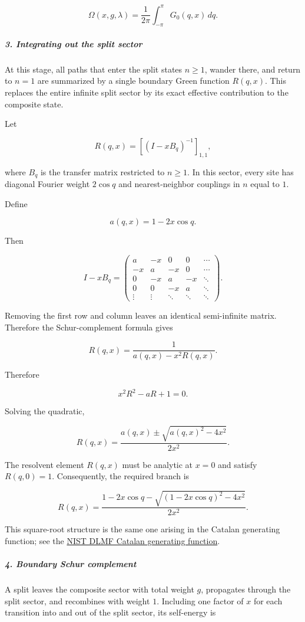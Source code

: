 \[
\Omega(x,g,\lambda) = \frac{1}{2\pi}\int_{-\pi}^{\pi}G_0(q,x)\,dq.
\]

\subparagraph*{3. Integrating out the split sector}

At this stage, all paths that enter the split states $n\geq1$, wander there, and return to $n=1$ are summarized by a single boundary Green function $R(q,x)$. This replaces the entire infinite split sector by its exact effective contribution to the composite state.

Let

\[
R(q,x) = \left[(I-xB_q)^{-1}\right]_{1,1},
\]

where $B_q$ is the transfer matrix restricted to $n\geq1$. In this sector, every site has diagonal Fourier weight $2\cos q$ and nearest-neighbor couplings in $n$ equal to $1$.

Define

\[
a(q,x)=1-2x\cos q.
\]

Then

\[
I-xB_q=
\begin{pmatrix}
a&-x&0&0&\cdots\\
-x&a&-x&0&\cdots\\
0&-x&a&-x&\ddots\\
0&0&-x&a&\ddots\\
\vdots&\vdots&\ddots&\ddots&\ddots
\end{pmatrix}.
\]

Removing the first row and column leaves an identical semi-infinite matrix. Therefore the Schur-complement formula gives

\[
R(q,x) = \frac{1}{a(q,x)-x^2R(q,x)}.
\]

Therefore

\[
x^2R^2-aR+1=0.
\]

Solving the quadratic,

\[
R(q,x) = \frac{a(q,x)\pm\sqrt{a(q,x)^2-4x^2}}{2x^2}.
\]

The resolvent element $R(q,x)$ must be analytic at $x=0$ and satisfy $R(q,0)=1$. Consequently, the required branch is

\[
R(q,x) = \frac{ 1-2x\cos q - \sqrt{\left(1-2x\cos q\right)^2-4x^2} }{2x^2}.
\]

This square-root structure is the same one arising in the Catalan generating function; see the \href{\detokenize{https://dlmf.nist.gov/26.5.E2}}{NIST DLMF Catalan generating function}.

\subparagraph*{4. Boundary Schur complement}

A split leaves the composite sector with total weight $g$, propagates through the split sector, and recombines with weight $1$. Including one factor of $x$ for each transition into and out of the split sector, its self-energy is

